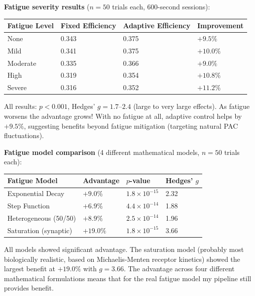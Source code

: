 \documentclass[11pt,letterpaper]{article}
\begin{document}
\textbf{Fatigue severity results} ($n = 50$ trials each, 600-second sessions):

\vspace{0.5em}
\begin{tabular}{@{}llll@{}}
\toprule
\textbf{Fatigue Level} & \textbf{Fixed Efficiency} & \textbf{Adaptive Efficiency} & \textbf{Improvement} \\
\midrule
None     & 0.343 & 0.375 & $+9.5\%$ \\
Mild     & 0.341 & 0.375 & $+10.0\%$ \\
Moderate & 0.335 & 0.366 & $+9.0\%$ \\
High     & 0.319 & 0.354 & $+10.8\%$ \\
Severe   & 0.316 & 0.352 & $+11.2\%$ \\
\bottomrule
\end{tabular}
\vspace{0.5em}

All results: $p < 0.001$, Hedges' $g = 1.7$--$2.4$ (large to very large effects). As fatigue
worsens the advantage grows! With no fatigue at all, adaptive control helps by $+9.5\%$,
suggesting benefits beyond fatigue mitigation (targeting natural PAC fluctuations).

\textbf{Fatigue model comparison} (4 different mathematical models, $n = 50$ trials each):

\vspace{0.5em}
\begin{tabular}{@{}llll@{}}
\toprule
\textbf{Fatigue Model}     & \textbf{Advantage} & \textbf{$p$-value}       & \textbf{Hedges' $g$} \\
\midrule
Exponential Decay          & $+9.0\%$  & $1.8 \times 10^{-15}$ & 2.32 \\
Step Function              & $+6.9\%$  & $4.4 \times 10^{-14}$ & 1.88 \\
Heterogeneous (50/50)      & $+8.9\%$  & $2.5 \times 10^{-14}$ & 1.96 \\
Saturation (synaptic)      & $+19.0\%$ & $1.8 \times 10^{-15}$ & 3.66 \\
\bottomrule
\end{tabular}
\vspace{0.5em}

All models showed significant advantage. The saturation model (probably most biologically
realistic, based on Michaelis-Menten receptor kinetics) showed the largest benefit at
$+19.0\%$ with $g = 3.66$. The advantage across four different mathematical formulations
means that for the real fatigue model my pipeline still provides benefit.
\end{document}
